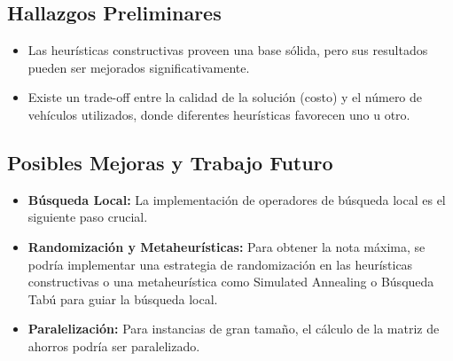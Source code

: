 \documentclass[a4paper,12pt]{article}
\begin{document}
\subsection{Hallazgos Preliminares}
\begin{itemize}
    \item Las heurísticas constructivas proveen una base sólida, pero sus resultados pueden ser mejorados significativamente.
    \item Existe un trade-off entre la calidad de la solución (costo) y el número de vehículos utilizados, donde diferentes heurísticas favorecen uno u otro.
\end{itemize}

\subsection{Posibles Mejoras y Trabajo Futuro}
\begin{itemize}
    \item \textbf{Búsqueda Local:} La implementación de operadores de búsqueda local es el siguiente paso crucial.
    \item \textbf{Randomización y Metaheurísticas:} Para obtener la nota máxima, se podría implementar una estrategia de randomización en las heurísticas constructivas o una metaheurística como Simulated Annealing o Búsqueda Tabú para guiar la búsqueda local.
    \item \textbf{Paralelización:} Para instancias de gran tamaño, el cálculo de la matriz de ahorros podría ser paralelizado.
\end{itemize}
\end{document}
